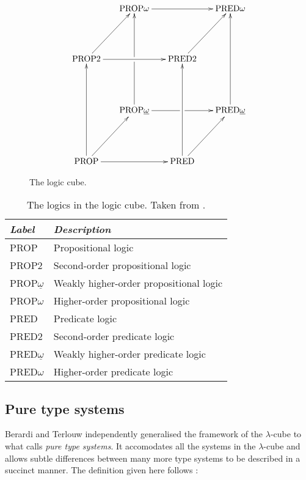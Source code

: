 \documentclass[12pt,toc=bibliography,numbers=noendperiod,
               footnotes=multiple,twoside]{scrartcl}
\begin{document}
\begin{figure}
\begin{equation*}
\xymatrix@R46pt@C16pt{%
&\textrm{PROP}\omega\ar@{->}[rr]&&\textrm{PRED}\omega \\
\textrm{PROP2}\ar@{->}[rr]\ar@{->}[ur]&&\textrm{PRED2}\ar@{->}[ur] \\
&\textrm{PROP}\underline{\omega}\ar@{->}[uu]|!{"2,1";"2,3"}\hole\ar@{->}[rr]|!{"4,3";"2,3"}\hole&&\textrm{PRED}\underline{\omega}\ar@{->}[uu] \\
\textrm{PROP}\ar@{->}[uu]\ar@{->}[rr]\ar@{->}[ur]&&\textrm{PRED}\ar@{->}[uu]\ar@{->}[ur]
}
\end{equation*}
\caption{The logic cube.}
\label{fig:l-cube}
\end{figure}

\begin{table}[h]
    \centering
    \begin{tabular}{l l}
        \toprule
        \textit{Label} & \textit{Description} \\
        \midrule
        PROP & Propositional logic \\
        PROP2 & Second-order propositional logic \\
        PROP\(\underline{\omega}\) & Weakly higher-order propositional logic \\
        PROP\(\omega\) & Higher-order propositional logic \\
        PRED & Predicate logic \\
        PRED2 & Second-order predicate logic \\
        PRED\(\underline{\omega}\) & Weakly higher-order predicate logic \\
        PRED\(\omega\) & Higher-order predicate logic \\
        \bottomrule
    \end{tabular}
    \caption{The logics in the logic cube. Taken from \textcite[248]{barendregt_lambda_1992}.}
    \label{tab:l-cube-names}
\end{table}


\subsection{Pure type systems}

Berardi and Terlouw independently generalised the framework of the \(\lambda\)-cube to what \textcite{barendregt_lambda_1992} calls \emph{pure type systems}. It accomodates all the systems in the \(\lambda\)-cube and allows subtle differences between many more type systems to be described in a succinct manner. The definition given here follows \textcite[213f.]{barendregt_lambda_1992}:
\end{document}
